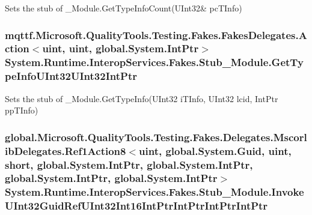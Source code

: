 Sets the stub of \-\_\-\-Module.\-Get\-Type\-Info\-Count(U\-Int32\& pc\-T\-Info)

\hypertarget{class_system_1_1_runtime_1_1_interop_services_1_1_fakes_1_1_stub___module_affc77e51393759427ddbd2719bb0e9aa}{
\subsubsection[{Get\-Type\-Info\-U\-Int32\-U\-Int32\-Int\-Ptr}]{\setlength{\rightskip}{0pt plus 5cm}mqttf.\-Microsoft.\-Quality\-Tools.\-Testing.\-Fakes.\-Fakes\-Delegates.\-Action$<$uint, uint, global.\-System.\-Int\-Ptr$>$ System.\-Runtime.\-Interop\-Services.\-Fakes.\-Stub\-\_\-\-Module.\-Get\-Type\-Info\-U\-Int32\-U\-Int32\-Int\-Ptr}}\label{class_system_1_1_runtime_1_1_interop_services_1_1_fakes_1_1_stub___module_affc77e51393759427ddbd2719bb0e9aa}


Sets the stub of \-\_\-\-Module.\-Get\-Type\-Info(\-U\-Int32 i\-T\-Info, U\-Int32 lcid, Int\-Ptr pp\-T\-Info)

\hypertarget{class_system_1_1_runtime_1_1_interop_services_1_1_fakes_1_1_stub___module_a44ca0ec7eb2400f8614b63ecf091266e}{
\subsubsection[{Invoke\-U\-Int32\-Guid\-Ref\-U\-Int32\-Int16\-Int\-Ptr\-Int\-Ptr\-Int\-Ptr\-Int\-Ptr}]{\setlength{\rightskip}{0pt plus 5cm}global.\-Microsoft.\-Quality\-Tools.\-Testing.\-Fakes.\-Delegates.\-Mscorlib\-Delegates.\-Ref1\-Action8$<$uint, global.\-System.\-Guid, uint, short, global.\-System.\-Int\-Ptr, global.\-System.\-Int\-Ptr, global.\-System.\-Int\-Ptr, global.\-System.\-Int\-Ptr$>$ System.\-Runtime.\-Interop\-Services.\-Fakes.\-Stub\-\_\-\-Module.\-Invoke\-U\-Int32\-Guid\-Ref\-U\-Int32\-Int16\-Int\-Ptr\-Int\-Ptr\-Int\-Ptr\-Int\-Ptr}}\label{class_system_1_1_runtime_1_1_interop_services_1_1_fakes_1_1_stub___module_a44ca0ec7eb2400f8614b63ecf091266e}


